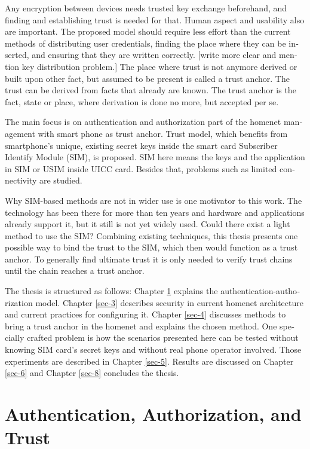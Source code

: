 \documentclass[12pt,a4paper,english]{tutthesis}
\begin{document}
\begin{otherlanguage}{english}
Any encryption between devices needs trusted key exchange
beforehand, and finding and establishing trust is needed for that.
Human aspect and usability also are important. The proposed model should
require less effort than the current methods of distributing user
credentials, finding the place where they can be inserted, and
ensuring that they are written correctly. 
[write more clear and mention key distribution problem.]
The place where trust is not anymore derived or built upon other 
fact, but assumed to be present is called a trust anchor.
The trust can be derived from facts that already are known.
The trust anchor is the fact, state or place, where derivation is
done no more, but accepted per se.


The main focus is on authentication and authorization part of
the homenet management with smart phone as trust anchor.
Trust model, which benefits from smartphone's unique,
existing secret keys inside the smart card Subscriber Identify Module
(SIM), is proposed. 
SIM here means the keys and the application in SIM or USIM inside UICC card. 
Besides that, problems such as limited connectivity are studied. 


Why SIM-based methods are not in wider use is one motivator to this
work.  The technology has been there for more than ten years and
hardware and applications already support it, but it still is not yet
widely used.  Could there exist a light method to use the SIM?  Combining
existing techniques, this thesis presents one possible way to bind the
trust to the SIM, which then would function as a trust anchor. To
generally find ultimate trust it is only needed to verify trust chains
until the chain reaches a trust anchor.




The thesis is structured as follows: Chapter \ref{sec-2} explains the authentication-authorization model.
Chapter \ref{sec-3} describes security in current homenet architecture and 
current practices for configuring it.
 Chapter \ref{sec-4}
discusses methods to bring a trust anchor in the homenet and explains
the chosen method.
One specially crafted problem is how the scenarios presented here can be
tested without knowing SIM card's secret keys and without real phone
operator involved.  Those experiments are described in Chapter
\ref{sec-5}.
Results are discussed on Chapter \ref{sec-6} and Chapter \ref{sec-8} concludes the
thesis.
\chapter{Authentication, Authorization, and Trust}
\label{sec-2}


\end{otherlanguage}
\end{document}
